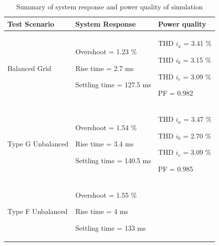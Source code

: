 \begin{table}[htbp]
    \centering
    \caption{Summary of system response and power quality of simulation}
    \begin{tabular}{|m{4cm}|m{5.5cm}|m{4.5cm}|}
        \hline
        \textbf{Test Scenario} & \textbf{System Response} & \textbf{Power quality}\\ \hline
        Balanced Grid  & \begin{tabitemize}
            \item Overshoot = 1.23 \%
            \item Rise time = 2.7 ms
            \item Settling time = 127.5 ms
        \end{tabitemize} & 
        \begin{tabitemize}
            \item THD $i_a$ = 3.41 \%
            \item THD $i_b$ = 3.15 \%
            \item THD $i_c$ = 3.09 \%
            \item PF = 0.982
        \end{tabitemize} \\ \hline
        Type G Unbalanced  & 
        \begin{tabitemize}
            \item Overshoot = 1.54 \%
            \item Rise time = 3.4 ms
            \item Settling time = 140.5 ms
        \end{tabitemize} & 
        \begin{tabitemize}
            \item THD $i_a$ = 3.47 \%
            \item THD $i_b$ = 2.70 \%
            \item THD $i_c$ = 3.09 \%
            \item PF = 0.985
        \end{tabitemize} \\ \hline
        Type F Unbalanced  & 
        \begin{tabitemize}
            \item Overshoot = 1.55 \%
            \item Rise time = 4 ms
            \item Settling time = 133 ms
        \end{tabitemize} & 
        \begin{tabitemize}

\end{tabitemize}
\end{tabular}
\end{table}
